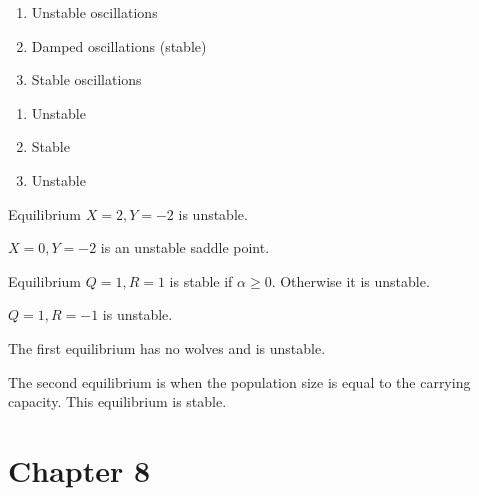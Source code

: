 \documentclass[]{memoir}
\begin{document}
\begin{enumerate}
\def\labelenumi{\arabic{enumi}.}
\itemsep1pt\parskip0pt
\item
  Unstable oscillations
\item
  Damped oscillations (stable)
\item
  Stable oscillations
\end{enumerate}


\begin{enumerate}
\def\labelenumi{\arabic{enumi}.}
\itemsep1pt\parskip0pt
\item
  Unstable
\item
  Stable
\item
  Unstable
\end{enumerate}


Equilibrium $X=2, Y=-2$ is unstable.

$X=0, Y=-2$ is an unstable saddle point.


Equilibrium $Q=1, R=1$ is stable if $\alpha \geq 0$. Otherwise it is
unstable.

$Q=1, R=-1$ is unstable.


The first equilibrium has no wolves and is unstable.

The second equilibrium is when the population size is equal to the
carrying capacity. This equilibrium is stable.

\section{Chapter 8}
\end{document}
